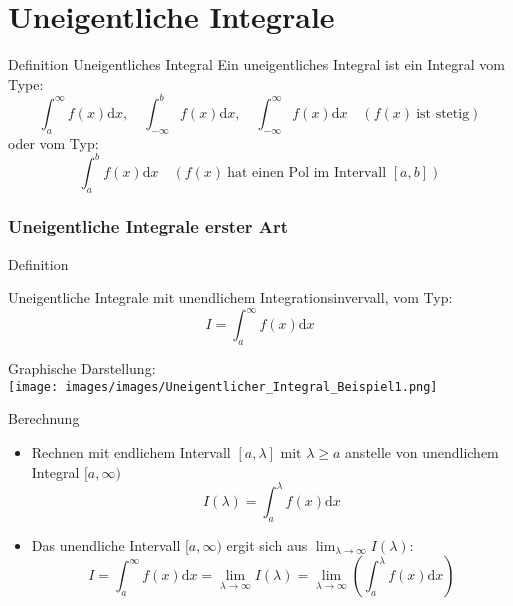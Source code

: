 \section{Uneigentliche Integrale}
\begin{definition}{Definition Uneigentliches Integral}
	Ein uneigentliches Integral ist ein Integral vom Type:
	\[\int_a^\infty{f(x)\mathrm{d}x}, \quad \int_{-\infty}^b{f(x)\mathrm{d}x}, \quad
	\int_{-\infty}^{\infty}{f(x)\mathrm{d}x} \quad (f(x) \: \text{ist stetig}) \]
	oder vom Typ:
	\[\int_a^b{f(x)\mathrm{d}x} \quad (f(x)\:\text{hat einen Pol im Intervall }[a,b]) \]
\end{definition}
\subsubsection{Uneigentliche Integrale erster Art}
\begin{definition}{Definition}\\
	\begin{minipage}{0.5\linewidth}
		Uneigentliche Integrale mit unendlichem Integrationsinvervall, vom Typ:
	\[I=\int_a^{\infty}{f(x)\mathrm{d}x} \]
	\end{minipage}
	\begin{minipage}{0.5\linewidth}
		\begin{center}
			Graphische Darstellung:\\
			\texttt{[image: images/images/Uneigentlicher\_Integral\_Beispiel1.png]}
		\end{center}
	\end{minipage}
\end{definition}
\begin{KR}{Berechnung}
\begin{itemize}
	\item Rechnen mit endlichem Intervall \([a,\lambda] \text{ mit } \lambda \ge a \) anstelle von unendlichem
		Integral \([a,\infty) \)
		\[I(\lambda)=\int_a^{\lambda}{f(x)\mathrm{d}x} \]
	\item Das unendliche Intervall \([a,\infty) \) ergit sich aus \(\lim_{\lambda \rightarrow
		\infty}I(\lambda) \):
		\[I=\int_a^{\infty}{f(x)\mathrm{d}x}=\underset{\lambda \rightarrow \infty}{\lim}I(\lambda)=
		\underset{\lambda \rightarrow \infty}{\lim}\left(\int_a^{\lambda}{f(x)\mathrm{d}x}\right) \]
\end{itemize}
\end{KR}

